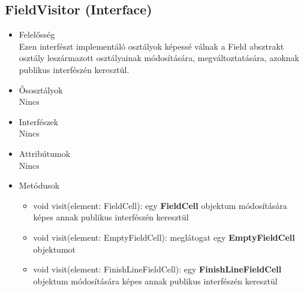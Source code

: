 \subsection{FieldVisitor (Interface)}
\begin{itemize}

\item Felelősség\\
Ezen interfészt implementáló osztályok képessé válnak a Field absztrakt osztály leszármazott osztályainak módosítására, megváltoztatására, azoknak publikus interfészén keresztül.

\item Ősosztályok\\
Nincs

\item Interfészek\\
Nincs

\item Attribútumok\\
Nincs

\item Metódusok\\

\begin{itemize}
    \item void visit(element: FieldCell): egy \textbf{FieldCell} objektum módosítására képes annak publikus interfészén keresztül
    \item void visit(element: EmptyFieldCell): meglátogat egy \textbf{EmptyFieldCell} objektumot
    \item void visit(element: FinishLineFieldCell): egy \textbf{FinishLineFieldCell} objektum módosítására képes annak publikus interfészén keresztül
\end{itemize}

\end{itemize}

